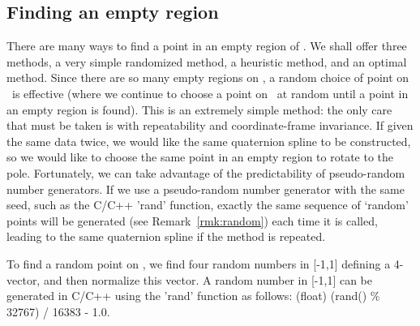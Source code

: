 
\subsection{Finding an empty region}

There are many ways to find a point in an empty region of .
We shall offer three methods, a very simple randomized method, 
a heuristic method, and an optimal method.
Since there are so many empty regions on ,
a random choice of point on \ is effective 
(where we continue to choose a point on \ 
at random until a point in an empty region is found).
This is an extremely simple method: the only care that must
be taken is with repeatability and coordinate-frame invariance.
If given the same data twice, we would like the same 
quaternion spline to be constructed, 
so we would like to choose the same point in an empty region
to rotate to the pole.
Fortunately, we can take advantage of the predictability 
of pseudo-random number generators.
If we use a pseudo-random number generator with the same seed,
such as the C/C++ 'rand' function, exactly the same sequence of `random'
points will be generated (see Remark~\ref{rmk:random}) 
each time it is called,
leading to the same quaternion spline if the method is repeated.
%
\begin{rmk}
\label{rmk:random}
To find a random point on , we find four random numbers 
in [-1,1] defining a 4-vector, and then normalize this vector.
A random number in [-1,1] can be generated in C/C++ using the 'rand' function
as follows:
(float) (rand() \% 32767) / 16383 - 1.0.
\end{rmk}
